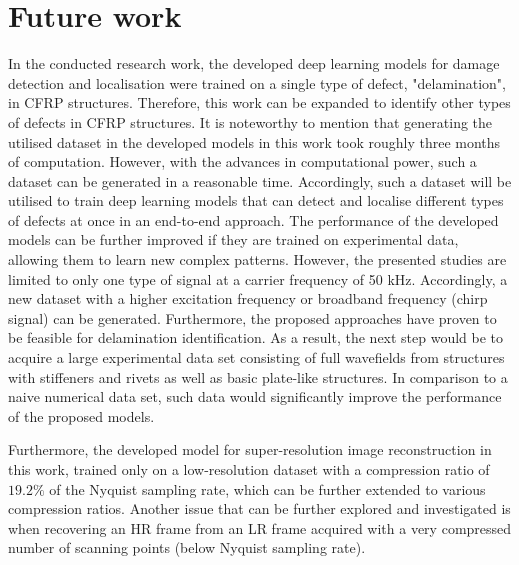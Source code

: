 \section{Future work}
\label{sec62}

In the conducted research work, the developed deep learning models for damage detec\-tion and localisation were trained on a single type of defect, "delamination", in CFRP structures.
Therefore, this work can be expanded to identify other types of defects in CFRP structures.
It is noteworthy to mention that generating the utilised dataset in the developed models in this work took roughly three months of computation.
However, with the advances in computational power, such a dataset can be generated in a reasonable time.
Accordingly, such a dataset will be utilised to train deep learning models that can detect and localise different types of defects at once in an end-to-end approach.
The performance of the developed models can be further improved if they are trained on experimental data, allowing them to learn new complex patterns.
However, the presented studies are limited to only one type of signal at a carrier frequency of 50 kHz.
Accordingly, a new dataset with a higher excitation frequency or broadband frequency (chirp signal) can be generated.
Furthermore, the proposed approaches have proven to be feasible for delamination identification.
As a result, the next step would be to acquire a large experimental data set consisting of full wavefields from structures with stiffeners and rivets as well as basic plate-like structures.
In comparison to a naive numerical data set, such data would significantly improve the performance of the proposed models.

Furthermore, the developed model for super-resolution image reconstruction in this work, trained only on a low-resolution dataset with a compression ratio of $19.2\%$ of the Nyquist sampling rate, which can be further extended to various compression ratios.
Another issue that can be further explored and investigated is when recovering an HR frame from an LR frame acquired with a very compressed number of scanning points (below Nyquist sampling rate). 





